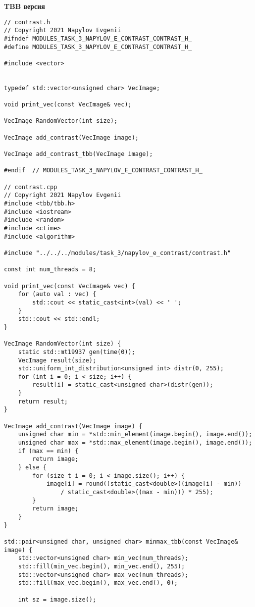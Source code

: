 \documentclass{report}
\begin{document}
    \textbf{TBB версия}
    \begin{lstlisting}
// contrast.h
// Copyright 2021 Napylov Evgenii
#ifndef MODULES_TASK_3_NAPYLOV_E_CONTRAST_CONTRAST_H_
#define MODULES_TASK_3_NAPYLOV_E_CONTRAST_CONTRAST_H_

#include <vector>


typedef std::vector<unsigned char> VecImage;

void print_vec(const VecImage& vec);

VecImage RandomVector(int size);

VecImage add_contrast(VecImage image);

VecImage add_contrast_tbb(VecImage image);

#endif  // MODULES_TASK_3_NAPYLOV_E_CONTRAST_CONTRAST_H_

// contrast.cpp
// Copyright 2021 Napylov Evgenii
#include <tbb/tbb.h>
#include <iostream>
#include <random>
#include <ctime>
#include <algorithm>

#include "../../../modules/task_3/napylov_e_contrast/contrast.h"

const int num_threads = 8;

void print_vec(const VecImage& vec) {
    for (auto val : vec) {
        std::cout << static_cast<int>(val) << ' ';
    }
    std::cout << std::endl;
}

VecImage RandomVector(int size) {
    static std::mt19937 gen(time(0));
    VecImage result(size);
    std::uniform_int_distribution<unsigned int> distr(0, 255);
    for (int i = 0; i < size; i++) {
        result[i] = static_cast<unsigned char>(distr(gen));
    }
    return result;
}

VecImage add_contrast(VecImage image) {
    unsigned char min = *std::min_element(image.begin(), image.end());
    unsigned char max = *std::max_element(image.begin(), image.end());
    if (max == min) {
        return image;
    } else {
        for (size_t i = 0; i < image.size(); i++) {
            image[i] = round((static_cast<double>((image[i] - min))
                / static_cast<double>((max - min))) * 255);
        }
        return image;
    }
}

std::pair<unsigned char, unsigned char> minmax_tbb(const VecImage& image) {
    std::vector<unsigned char> min_vec(num_threads);
    std::fill(min_vec.begin(), min_vec.end(), 255);
    std::vector<unsigned char> max_vec(num_threads);
    std::fill(max_vec.begin(), max_vec.end(), 0);

    int sz = image.size();


\end{lstlisting}
\end{document}
